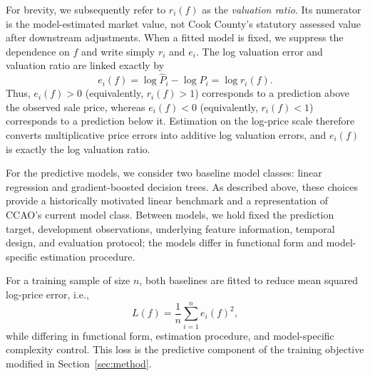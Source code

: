 \documentclass[10pt]{article}
\theoremstyle{definition}
\newcommand{\1}{\mathbf{1}}
\begin{document}


{For brevity, we subsequently refer to $r_i(f)$ as the \emph{valuation ratio}. Its numerator is the model-estimated market value, not Cook County's statutory assessed value after downstream adjustments. When a fitted model is fixed, we suppress the dependence on $f$ and write simply $r_i$ and $e_i$. The log valuation error and valuation ratio are linked exactly by}
\begin{equation}
\label{eq:log_ratio}
e_i(f)
=
\log \widehat{P}_i-\log P_i
=
\log r_i(f).
\end{equation}
Thus, $e_i(f)>0$ (equivalently, $r_i(f)>1$) corresponds to a prediction above the observed sale price, whereas $e_i(f)<0$ (equivalently, $r_i(f)<1$) corresponds to a prediction below it.
{Estimation on the log-price scale therefore converts multiplicative price errors into additive log valuation errors, and $e_i(f)$ is exactly the log valuation ratio.}

For the predictive models, we consider two baseline model classes: linear regression and gradient-boosted decision trees. As described above, these choices provide a historically motivated linear benchmark and a representation of CCAO's current model class. Between models, we hold fixed the prediction target, development observations, underlying feature information, temporal design, and evaluation protocol; the models differ in functional form and model-specific estimation procedure.

For a training sample of size $n$, both baselines are fitted to reduce mean squared log-price error, i.e.,
\begin{equation}
\label{eq:baseline_learning}
L(f)
=
\frac{1}{n}\sum_{i=1}^n e_i(f)^2,
\end{equation}
while differing in functional form, estimation procedure, and model-specific complexity control. This loss is the predictive component of the training objective modified in Section~\ref{sec:method}.
\end{document}
